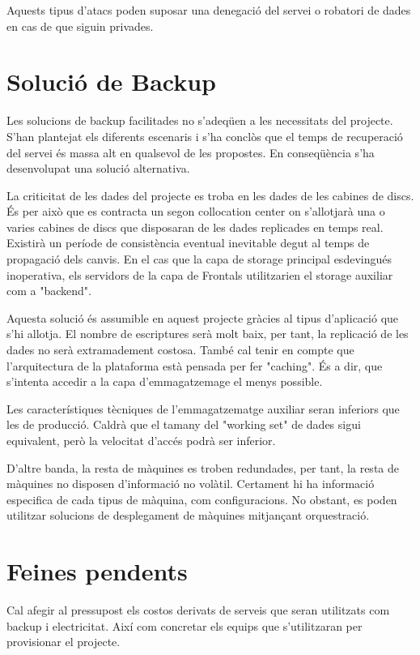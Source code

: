 \documentclass[a4paper, 11pt]{article}
\begin{document}
Aquests tipus d'atacs poden suposar una denegació del servei o robatori de dades en cas de que siguin privades.


\section{Solució de Backup}

Les solucions de backup facilitades no s'adeqüen a les necessitats del projecte. S'han plantejat els diferents escenaris i s'ha conclòs que el temps de recuperació del servei és massa alt en qualsevol de les propostes. En conseqüència s'ha desenvolupat una solució alternativa. 

La criticitat de les dades del projecte es troba en les dades de les cabines de discs. És per això que es contracta un segon collocation center on s'allotjarà una o varies cabines de discs que disposaran de les dades replicades en temps real. Existirà un període de consistència eventual inevitable degut al temps de propagació dels canvis. En el cas que la capa de storage principal esdevingués inoperativa, els servidors de la capa de Frontals utilitzarien el storage auxiliar com a "backend". 

Aquesta solució és assumible en aquest projecte gràcies al tipus d'aplicació que s'hi allotja. El nombre de escriptures serà molt baix, per tant, la replicació de les dades no serà extramadement costosa. També cal tenir en compte que l'arquitectura de la plataforma està pensada per fer "caching". És a dir, que s'intenta accedir a la capa d'emmagatzemage el menys possible. 

Les característiques tècniques de l'emmagatzematge auxiliar seran inferiors que les de producció. Caldrà que el tamany del "working set" de dades sigui equivalent, però la velocitat d'accés podrà ser inferior. 


D'altre banda, la resta de màquines es troben redundades, per tant, la resta de màquines no disposen d'informació no volàtil. Certament hi ha informació especifica de cada tipus de màquina, com configuracions. No obstant, es poden utilitzar solucions de desplegament de màquines mitjançant orquestració. 


\section{Feines pendents}

Cal afegir al pressupost els costos derivats de serveis que seran utilitzats com backup i electricitat. Així com concretar els equips que s'utilitzaran per provisionar el projecte. 
\end{document}
